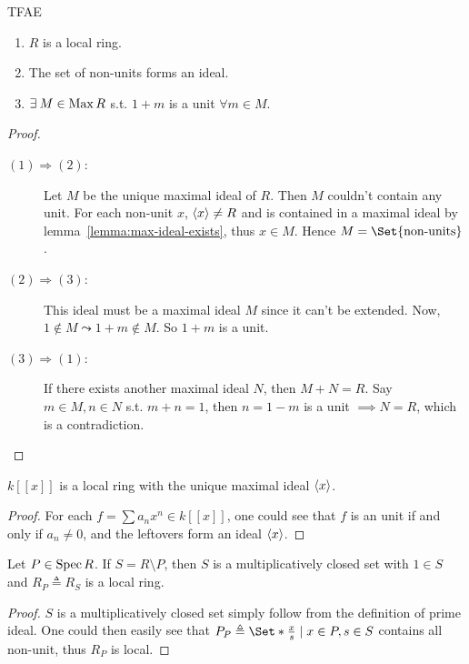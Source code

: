 \begin{prop}
  TFAE
  \begin{enumerate}[(1)]
    \item $R$ is a local ring.
    \item The set of non-units forms an ideal.
    \item $\exists M \in \Max R$ s.t. $1 + m$ is a unit $\forall m \in M$.
  \end{enumerate}

  \begin{proof} \mbox{}
    \begin{description}
      \item[$(1)\Rightarrow(2)$:]
        Let $M$ be the unique maximal ideal of $R$. Then $M$ couldn't contain
        any unit. For each non-unit $x$,
        $\langle x\rangle \neq R$ and is contained in a maximal ideal by
        lemma~\ref{lemma:max-ideal-exists}, thus $x \in M$.
        Hence $M = \Set{ \text{non-units} }$.
      \item[$(2) \Rightarrow (3)$:]
        This ideal must be a maximal ideal $M$ since it can't be extended.
        Now, $1 \notin M \leadsto 1 + m \notin M$. So $1 + m$ is a unit.
      \item[$(3)\Rightarrow(1)$:]
        If there exists another maximal ideal $N$, then $M + N = R$.
        Say $m \in  M, n \in N$ s.t. $m + n = 1$, then $n = 1 - m$ is a unit
        $\implies N = R$, which is a contradiction.
        \qedhere
    \end{description}
  \end{proof}
\end{prop}

\begin{example}
  $k[[x]]$ is a local ring with the unique maximal ideal $\langle x\rangle$.
  \begin{proof}
    For each $f = \sum a_n x^n \in k[[x]]$, one could see that $f$ is
    an unit if and only if $a_n \neq 0$, and the leftovers form an
    ideal $\langle x\rangle$.
  \end{proof}
\end{example}

\begin{example}
  Let $P \in \operatorname{Spec} R$. If $S = R \setminus P$, then $S$ is a multiplicatively
  closed set with $1 \in S$ and $R_P \triangleq R_S$ is a local ring.

  \begin{proof}
    $S$ is a multiplicatively closed set simply follow from the definition of prime ideal.
    One could then easily see that $P_P \triangleq \Set*{\frac{x}{s} \mid x \in P, s \in S}$
    contains all non-unit, thus $R_P$ is local.
  \end{proof}
\end{example}


